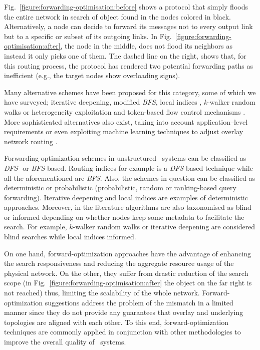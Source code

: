 Fig.~\ref{figure:forwarding-optimisation:before} 
shows a protocol that simply floods the entire network 
in search of object found in the nodes colored in black.
Alternatively, a node can decide to forward its
messages not to every output link but to a specific 
or subset of its outgoing links.
In Fig.~\ref{figure:forwarding-optimisation:after}, 
the node in the middle, does not flood its neighbors as instead 
it only picks one of them.
The dashed line on the right, shows that, 
for this routing process, the protocol has
rendered two potential forwarding paths as inefficient (e.g., the target nodes
show overloading signs).

Many alternative schemes have been proposed for this category, some of which we
have surveyed; iterative deepening, modified \emph{BFS}, local indices \cite{YG-M2002},
$k$-walker random walks \cite{LCCLS2002} or heterogeneity exploitation and
token-based flow control mechanisms \cite{CRBLS2003}. More sophisticated
alternatives also exist, taking into account application--level requirements
or even exploiting machine learning techniques to adjust overlay network
routing \cite{BFLZ2003}.

Forwarding-optimization schemes in unstructured \p\ systems can be classified
as \emph{DFS-} or \emph{BFS}-based. Routing indices \cite{CG-M2002} for example is a
\emph{DFS}-based technique while all the aforementioned are \emph{BFS}. Also,
the schemes in question can
be classified as deterministic or probabilistic (probabilistic, random or
ranking-based query forwarding). Iterative deepening and local indices
\cite{YG-M2002} are examples of deterministic approaches. Moreover, in the
literature algorithms are also taxonomised as blind or informed depending on
whether nodes keep some metadata to facilitate the search. For example,
$k$-walker random walks or iterative deepening are considered blind searches
while local indices informed.

On one hand, forward-optimization approaches have 
the advantage of enhancing the
search responsiveness and reducing the aggregate resource 
usage of the physical network. On the other, 
they suffer from drastic reduction of the search
scope (in Fig.~\ref{figure:forwarding-optimisation:after} the object on
the far right is not reached) thus, limiting the scalability of the whole
network. 
Forward-optimization suggestions address the problem of the mismatch 
in a limited manner since they do not provide any guarantees 
that overlay and underlying topologies are
aligned with each other.
To this end, forward-optimization techniques are commonly applied in
conjunction with other methodologies to improve 
the overall quality of \p\ systems.


